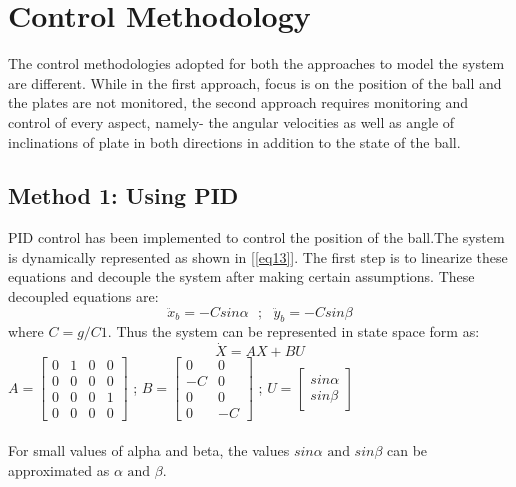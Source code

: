 \documentclass[conference]{IEEEtran}
\begin{document}
\section{Control Methodology}
The control methodologies adopted for both the approaches to model the system are different. While in the first approach, focus is on the position of the ball and the plates are not monitored, the second approach requires monitoring and control of every aspect, namely- the angular velocities as well as angle of inclinations of plate in both directions in addition to the state of the ball.

\subsection{Method 1: Using PID}
PID control has been implemented to control the position of the ball.The system is dynamically represented as shown in [\ref{eq13}]. The first step is to linearize these equations and decouple the system after making certain assumptions. These decoupled equations are: 
\begin{equation} \ddot x_b = -Csin \alpha \>\>\> ; \>\>\>  \ddot y_b = -Csin \beta \label{eq15}\end{equation} where $C = g/C1$.
Thus the system can be represented in state space form as:
\begin{equation}
\dot X = A X + B U\label{eq16}
\end{equation}
$ A = \begin{bmatrix}
0 & 1 & 0 & 0 \\ 0 & 0 & 0 & 0 \\ 0 & 0 & 0 & 1 \\ 0 & 0 & 0 & 0
\end{bmatrix}$ \> ; \>
$ B = \begin{bmatrix}
0 & 0 \\ -C & 0 \\ 0 & 0 \\ 0 & -C
\end{bmatrix}$ \> ; \>
$ U = \begin{bmatrix}
sin \alpha \\ sin \beta
\end{bmatrix}$\\\\
For small values of alpha and beta, the values $sin \alpha \mbox{ and } sin \beta$ can be approximated as $\alpha \mbox{ and } \beta$.
\end{document}
